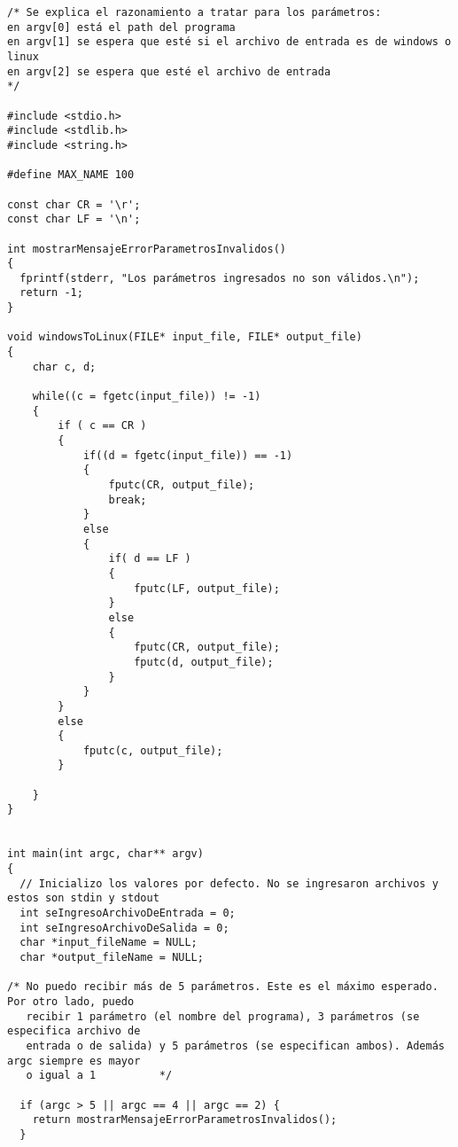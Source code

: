 \documentclass[a4paper,11pt]{article}
\begin{document}
\begin{verbatim}
/* Se explica el razonamiento a tratar para los parámetros:
en argv[0] está el path del programa
en argv[1] se espera que esté si el archivo de entrada es de windows o linux
en argv[2] se espera que esté el archivo de entrada
*/

#include <stdio.h>
#include <stdlib.h>
#include <string.h>

#define MAX_NAME 100

const char CR = '\r';
const char LF = '\n';

int mostrarMensajeErrorParametrosInvalidos()
{
  fprintf(stderr, "Los parámetros ingresados no son válidos.\n");
  return -1;
}

void windowsToLinux(FILE* input_file, FILE* output_file)
{
	char c, d;

	while((c = fgetc(input_file)) != -1)
	{
		if ( c == CR )
		{
      		if((d = fgetc(input_file)) == -1)
      		{
        		fputc(CR, output_file);
        		break;
      		}
      		else
      		{
        		if( d == LF )
        		{
          			fputc(LF, output_file);
        		}
		        else
		        {
		          	fputc(CR, output_file);
		          	fputc(d, output_file);
		        }
      		}
    	}
    	else
    	{
      		fputc(c, output_file);
    	}

	}
}


int main(int argc, char** argv)
{
  // Inicializo los valores por defecto. No se ingresaron archivos y estos son stdin y stdout
  int seIngresoArchivoDeEntrada = 0;
  int seIngresoArchivoDeSalida = 0;
  char *input_fileName = NULL;
  char *output_fileName = NULL;

/* No puedo recibir más de 5 parámetros. Este es el máximo esperado. Por otro lado, puedo
   recibir 1 parámetro (el nombre del programa), 3 parámetros (se especifica archivo de 
   entrada o de salida) y 5 parámetros (se especifican ambos). Además argc siempre es mayor
   o igual a 1          */

  if (argc > 5 || argc == 4 || argc == 2) {
    return mostrarMensajeErrorParametrosInvalidos();
  }


\end{verbatim}
\end{document}
